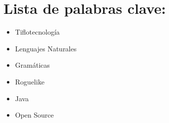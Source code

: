 \section*{Lista de palabras clave:}

\begin{itemize}
  \item Tiflotecnología
  \item Lenguajes Naturales
  \item Gramáticas
  \item Roguelike
  \item Java
  \item Open Source
\end{itemize}
